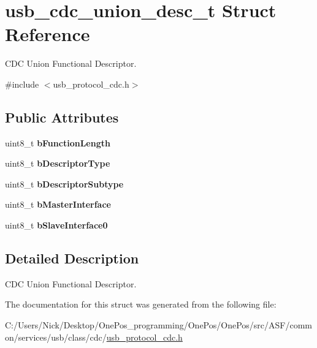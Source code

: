\hypertarget{structusb__cdc__union__desc__t}{\section{usb\-\_\-cdc\-\_\-union\-\_\-desc\-\_\-t Struct Reference}
\label{structusb__cdc__union__desc__t}
}


C\-D\-C Union Functional Descriptor.  




{\ttfamily \#include $<$usb\-\_\-protocol\-\_\-cdc.\-h$>$}

\subsection*{Public Attributes}
\begin{DoxyCompactItemize}
\item 
\hypertarget{structusb__cdc__union__desc__t_a7db931fd74ad9e709cb32ce747c21a86}{uint8\-\_\-t {\bfseries b\-Function\-Length}}\label{structusb__cdc__union__desc__t_a7db931fd74ad9e709cb32ce747c21a86}

\item 
\hypertarget{structusb__cdc__union__desc__t_a44a36f89b22074bdb06b38149ff733ac}{uint8\-\_\-t {\bfseries b\-Descriptor\-Type}}\label{structusb__cdc__union__desc__t_a44a36f89b22074bdb06b38149ff733ac}

\item 
\hypertarget{structusb__cdc__union__desc__t_a779233efcf69f0bcad014ac3b6c9229c}{uint8\-\_\-t {\bfseries b\-Descriptor\-Subtype}}\label{structusb__cdc__union__desc__t_a779233efcf69f0bcad014ac3b6c9229c}

\item 
\hypertarget{structusb__cdc__union__desc__t_af4e4d675b8761d7add9bf4137b94b111}{uint8\-\_\-t {\bfseries b\-Master\-Interface}}\label{structusb__cdc__union__desc__t_af4e4d675b8761d7add9bf4137b94b111}

\item 
\hypertarget{structusb__cdc__union__desc__t_af5d1cb7921388e8c381082db723e693d}{uint8\-\_\-t {\bfseries b\-Slave\-Interface0}}\label{structusb__cdc__union__desc__t_af5d1cb7921388e8c381082db723e693d}

\end{DoxyCompactItemize}


\subsection{Detailed Description}
C\-D\-C Union Functional Descriptor. 

The documentation for this struct was generated from the following file\-:\begin{DoxyCompactItemize}
\item 
C\-:/\-Users/\-Nick/\-Desktop/\-One\-Pos\-\_\-programming/\-One\-Pos/\-One\-Pos/src/\-A\-S\-F/common/services/usb/class/cdc/\hyperlink{usb__protocol__cdc_8h}{usb\-\_\-protocol\-\_\-cdc.\-h}\end{DoxyCompactItemize}
